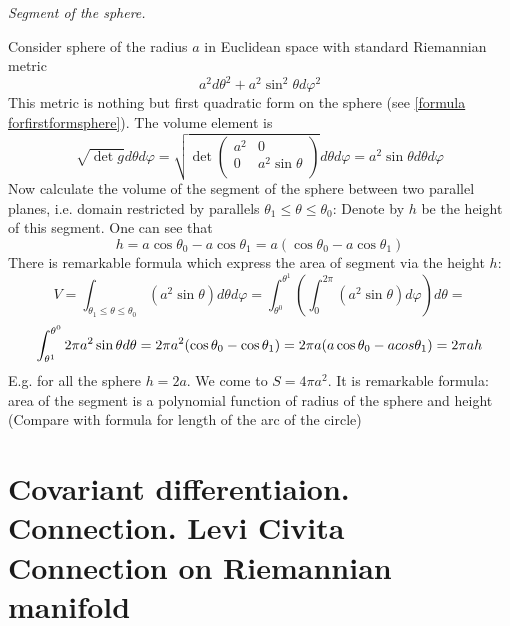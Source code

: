 \documentclass[12pt]{article}
\theoremstyle{theorem}
\numberwithin{equation}{section}
\begin{document}
                  \medskip
  {\it Segment of the sphere.}

    Consider sphere of the radius $a$ in Euclidean space with standard Riemannian metric
                       $$
            a^2 d\theta^2+a^2\sin^2\theta d\varphi^2
                       $$
  This metric is nothing but first quadratic form   on the sphere (see \eqref{formula forfirstformsphere}).
   The volume element is
                             $$
           \sqrt {\det g}d\theta  d\varphi=
         \sqrt
           {
         \det
         \left(
    \begin{array}{cc}
  a^2 & 0 \\
  0&  a^2\sin \theta \\
\end{array}
\right)}d\theta d\varphi=a^2\sin \theta d\theta d\varphi
                             $$
 Now calculate the volume of the segment of the sphere between two parallel planes,
 i.e. domain restricted  by parallels $\theta_1\leq \theta \leq \theta_0$:
   Denote by  $h$ be the height of this segment. One can see that
                 $$
               h=a\cos\theta_0-a\cos\theta_1=a(\cos\theta_0-a\cos \theta_1)
                $$
   There is remarkable formula which express the area of segment via the height $h$:
       $$
   V= \int_{\theta_1\leq \theta \leq \theta_0}\left (a^2\sin \theta \right)d\theta d\varphi=
         \int_{\theta^0}^{\theta^1}\left(\int_0^{2\pi}\left(a^2\sin \theta\right) d\varphi\right)d\theta=
                $$
\begin{equation}\label{areaoftheseqment}
       \int_{\theta^1}^{\theta^0} 2\pi a^2\sin\theta d\theta=2\pi a^2 (\cos \theta_0-\cos\theta_1)=
            2\pi a (a\cos \theta_0-a\\cos \theta_1)=2\pi a h
\end{equation}
 E.g. for all the sphere $h=2a$. We come to $S=4\pi a^2$.
It is remarkable formula: area of the segment is a polynomial function of radius of the sphere
 and height (Compare with formula for length of the arc of the circle)




\section {Covariant differentiaion. Connection. Levi Civita  Connection on Riemannian manifold}
\end{document}

